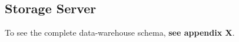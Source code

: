 \subsection{Storage Server}\label{subsec:impl_storage_server}


To see the complete data-warehouse schema, \textbf{see appendix X}.